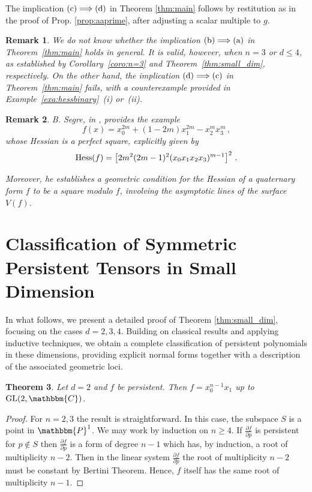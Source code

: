 \documentclass[aps,floatfix,groupedaddress,superscriptaddress,longbibliography,footinbib,notitlepage,showpacs]{revtex4-1}
\def\Hess{{\rm Hess}}
\newtheorem{theorem}{Theorem}
\newtheorem{remark}[theorem]{Remark}
\begin{document}
The implication $(\textnormal{c}) \Longrightarrow (\textnormal{d})$ in Theorem \ref{thm:main} follows by restitution as in the proof of Prop. \ref{prop:aaprime}, after adjusting a scalar multiple to $g$.

\begin{remark}
We do not know whether the implication $(\textnormal{b}) \Longrightarrow (\textnormal{a})$ in Theorem~\ref{thm:main} holds in general. It is valid, however, when $n=3$ or $d \leq 4$, as established by Corollary~\ref{coro:n=3} and Theorem~\ref{thm:small_dim}, respectively. On the other hand, the implication $(\textnormal{d}) \Longrightarrow (\textnormal{c})$ in Theorem~\ref{thm:main} fails, with a counterexample provided in Example~\ref{exa:hessbinary}~(i) or~(ii).

\end{remark}

\begin{remark}\label{rem:bsegre}
B. Segre, in \cite[(20)]{Seg60}, provides the example
\begin{equation}
f(x)=x_0^{2m}+(1-2m)x_1^{2m}-x_2^mx_3^m\,,
\end{equation}
whose Hessian is a perfect square, explicitly given by
\begin{equation}
\Hess(f)=\left[2m^2(2m-1)^2(x_0x_1x_2x_3)^{m-1}\right]^2\,.
\end{equation}

Moreover, he establishes a geometric condition for the Hessian of a quaternary form $f$ to be a square modulo $f$, involving the asymptotic lines of the surface $V(f)$.
\end{remark}
\section{Classification of Symmetric Persistent Tensors in Small Dimension}\label{sec.iv}

In what follows, we present a detailed proof of Theorem \ref{thm:small_dim}, focusing on the cases $d=2,3,4$. Building on classical results and applying inductive techniques, we obtain a complete classification of persistent polynomials in these dimensions, providing explicit normal forms together with a description of the associated geometric loci.

\begin{theorem}
Let $d=2$ and $f$ be persistent. Then $f=x_0^{n-1}x_1$ up to $\mathrm{GL}(2,\mathbbm{C})$.
\end{theorem}
\begin{proof}
For $n=2, 3$ the result is straightforward. In this case, the subspace $S$ is a point in $\mathbbm{P}^1$. We may work by induction on $n\geq 4$. If $\frac{\partial f}{\partial p}$ is persistent for $p\notin S$ then $\frac{\partial f}{\partial p}$ is a form of degree $n-1$ which has, by induction, a root of multiplicity $n-2$. Then in the linear system $\frac{\partial f}{\partial p}$ the root of multiplicity $n-2$ must be constant by Bertini Theorem. Hence, $f$ itself has the same root of multiplicity $n-1$.
\end{proof}
\end{document}
